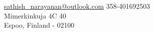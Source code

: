 
\nobreakvspace{0.3em}  %


\noindent\href{mailto:sathish_narayanan@outlook.com}{sathish\_narayanan\mbox{}@\mbox{}outlook.com}\sbull
\textsmaller{+}358-401692503
\\
Mimerkinkuja 4C 40
\\
Espoo, Finland - 02100 
